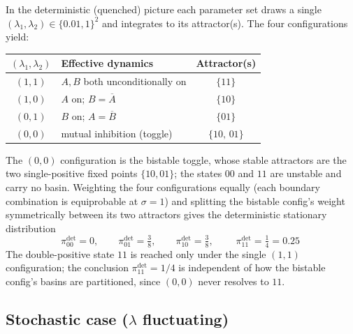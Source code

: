 \documentclass[11pt]{article}
\begin{document}
In the deterministic (quenched) picture each parameter set draws a single
$(\lambda_{1},\lambda_{2})\in\{0.01,1\}^2$ and integrates to its attractor(s).
The four configurations yield:
\begin{center}
\begin{tabular}{clc}
\toprule
$(\lambda_1,\lambda_2)$ & Effective dynamics & Attractor(s) \\
\midrule
$(1,1)$ & $A,B$ both unconditionally on & $\{11\}$ \\
$(1,0)$ & $A$ on; $B=\overline{A}$ & $\{10\}$ \\
$(0,1)$ & $B$ on; $A=\overline{B}$ & $\{01\}$ \\
$(0,0)$ & mutual inhibition (toggle) & $\{10,\,01\}$ \\
\bottomrule
\end{tabular}
\end{center}
The $(0,0)$ configuration is the bistable toggle, whose stable attractors are the
two single-positive fixed points $\{10,01\}$; the states $00$ and $11$ are
unstable and carry no basin. Weighting the four configurations equally (each
boundary combination is equiprobable at $\sigma=1$) and splitting the bistable
config's weight symmetrically between its two attractors gives the deterministic
stationary distribution
\begin{equation}
  \pi^{\det}_{00}=0,\qquad
  \pi^{\det}_{01}=\tfrac{3}{8},\qquad
  \pi^{\det}_{10}=\tfrac{3}{8},\qquad
  \boxed{\;\pi^{\det}_{11}=\tfrac{1}{4}=0.25\;}
  \label{eq:pidet}
\end{equation}
The double-positive state $11$ is reached only under the single $(1,1)$
configuration; the conclusion $\pi^{\det}_{11}=1/4$ is independent of how the
bistable config's basins are partitioned, since $(0,0)$ never resolves to $11$.

\subsection{Stochastic case ($\lambda$ fluctuating)}
\label{sec:annealed}
\end{document}

